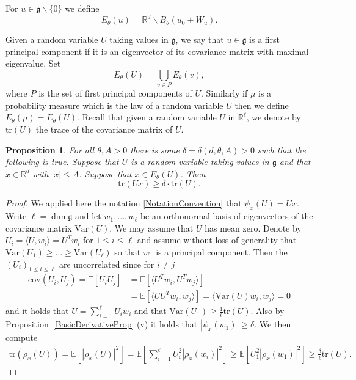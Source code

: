 \documentclass[10pt, english,oneside,reqno]{amsart}
\theoremstyle{plain}
\newtheorem{proposition}[theorem]{Proposition}
\theoremstyle{remark}
\numberwithin{equation}{section}
\numberwithin{figure}{section}
\newcommand{\tr}{\mathrm{tr}}
\newcommand{\R}{\mathbb{R}}
\newcommand{\E}{\mathbb{E}}
\begin{document}
For $u \in \mathfrak{g} \backslash \{ 0 \}$ we define   $$E_{\theta}(u) = \R^d \backslash B_{\theta}(u_0 + W_u).$$ 

Given a random variable $U$ taking values in $\mathfrak{g}$, we say that $u \in \mathfrak{g}$ is a first principal component if it is an eigenvector of its covariance matrix with maximal eigenvalue. Set $$E_{\theta}(U) = \bigcup_{v \in P} E_{\theta}(v),$$ where $P$ is the set of first principal components of $U$. Similarly if $\mu$ is a probability measure which is the law of a random variable $U$ then we define $E_{\theta}(\mu) = E_{\theta}(U)$. Recall that given a random variable $U$ in $\R^{\ell}$, we denote by $\mathrm{tr}(U)$ the trace of the covariance matrix of $U$.


\begin{proposition}\label{FirstDerivativeBound}
    For all $\theta,A > 0$ there is some $\delta = \delta(d,\theta,A) > 0$ such that the following is true. Suppose that $U$ is a random variable taking values in $\mathfrak{g}$ and that $x \in \R^d$ with $|x| \leq A$. Suppose that $x \in E_\theta(U)$. Then $$\tr(Ux) \geq \delta \cdot \tr(U).$$
\end{proposition}

\begin{proof}
    We applied here the notation \eqref{NotationConvention} that $\psi_x(U) = Ux$. Write $\ell = \dim \mathfrak{g}$ and let $w_1, \ldots , w_{\ell}$ be an orthonormal basis of eigenvectors of the covariance matrix $\mathrm{Var}(U)$. We may assume that $U$ has mean zero. Denote by $U_i = \langle U, w_i \rangle = U^Tw_i$ for $1 \leq i \leq \ell$ and assume without loss of generality that $\mathrm{Var}(U_1) \geq \ldots \geq \mathrm{Var}(U_{\ell})$ so that $w_1$ is a principal component. Then the $(U_i)_{1 \leq i \leq \ell}$ are uncorrelated since for $i \neq j$ 
    \begin{align*}
       \mathrm{cov}(U_i,U_j) = \E[U_i U_j] &= \E[\langle U^T w_i, U^T w_j \rangle] \\ &= \E[ \langle UU^T w_i, w_j \rangle ] =  \langle \mathrm{Var}(U)w_i, w_j \rangle = 0 
    \end{align*}
    and it holds that $U = \sum_{i = 1}^{\ell} U_i w_i$ and that $\mathrm{Var}(U_1) \geq \frac{1}{\ell}\mathrm{tr}(U)$. Also by Proposition~\ref{BasicDerivativeProp} (v) it holds that $|\psi_x(w_1)| \geq \delta$. We then compute 
    \begin{align*}
        \tr(\rho_x(U)) = \E[|\rho_x(U)|^2] = \E\left[ \sum_{i = 1}^{\ell} U_i^2 |\rho_x(w_i)|^2  \right] \geq \E[U_1^2 |\rho_x(w_1)|^2] \geq \frac{\delta}{\ell} \tr(U).
    \end{align*}
\end{proof}
\end{document}
